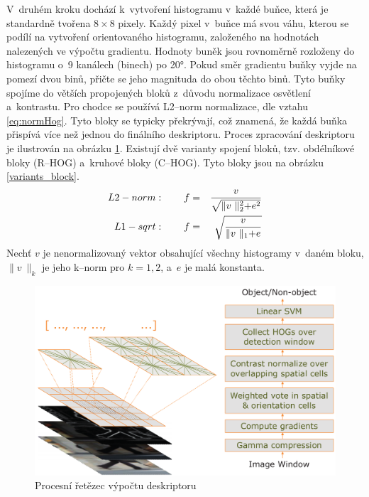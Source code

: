 V~druhém kroku dochází k~vytvoření histogramu v~každé buňce, která je standardně tvořena $8\times8$ pixely. Každý pixel v~buňce má svou váhu, kterou se podílí na vytvoření orientovaného histogramu, založeného na hodnotách nalezených ve výpočtu gradientu. Hodnoty buněk jsou rovnoměrně rozloženy do histogramu o~9 kanálech (binech) po \ang{20}. Pokud směr gradientu buňky vyjde na pomezí dvou binů, přičte se jeho magnituda do obou těchto binů.
Tyto buňky spojíme do větších propojených bloků z~důvodu normalizace osvětlení a~kontrastu. Pro chodce se používá L2--norm normalizace, dle vztahu \eqref{eq:normHog}. Tyto bloky se typicky překrývají, což znamená, že každá buňka přispívá více než jednou do finálního deskriptoru. Proces zpracování deskriptoru je ilustrován na obrázku \ref{hog_chain}. Existují dvě varianty spojení bloků, tzv. obdélníkové bloky (R--HOG) a~kruhové bloky (C--HOG). Tyto bloky jsou na obrázku \ref{variants_block}.  
\begin{equation}
\centering
 \label{eq:normHog}
 \begin{aligned}
L2-norm&: \qquad  f =& \frac{v}{\sqrt{\lVert v~\lVert_2^2 + e^2}} \\
L1-sqrt&: \qquad  f =& \sqrt{\frac{v}{\lVert v~\lVert_1 + e}}
 \end{aligned}
\end{equation}
Nechť $v$ je nenormalizovaný vektor obsahující všechny histogramy v~daném bloku, $\lVert v~\lVert_k$ je jeho k--norm pro $k = 1,2$, a~$e$ je malá konstanta.
 \begin{figure}[H]
\centering
\includegraphics[width=16cm]{figures/hog_pipeline}
\caption{Procesní řetězec výpočtu deskriptoru \cite{hog:dalal}}
\label{hog_chain}
\end{figure}

